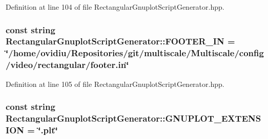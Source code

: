 \-Definition at line 104 of file \-Rectangular\-Gnuplot\-Script\-Generator.\-hpp.

\hypertarget{classmultiscale_1_1video_1_1RectangularGnuplotScriptGenerator_a5bff725c865bc3a426351644cee34229}{
\subsubsection[{\-F\-O\-O\-T\-E\-R\-\_\-\-I\-N}]{\setlength{\rightskip}{0pt plus 5cm}const string {\bf \-Rectangular\-Gnuplot\-Script\-Generator\-::\-F\-O\-O\-T\-E\-R\-\_\-\-I\-N} = \char`\"{}/home/ovidiu/\-Repositories/git/multiscale/\-Multiscale/config/video/rectangular/footer.\-in\char`\"{}}}\label{classmultiscale_1_1video_1_1RectangularGnuplotScriptGenerator_a5bff725c865bc3a426351644cee34229}


\-Definition at line 105 of file \-Rectangular\-Gnuplot\-Script\-Generator.\-hpp.

\hypertarget{classmultiscale_1_1video_1_1RectangularGnuplotScriptGenerator_afa1626f7904b3006ac768f770c799283}{
\subsubsection[{\-G\-N\-U\-P\-L\-O\-T\-\_\-\-E\-X\-T\-E\-N\-S\-I\-O\-N}]{\setlength{\rightskip}{0pt plus 5cm}const string {\bf \-Rectangular\-Gnuplot\-Script\-Generator\-::\-G\-N\-U\-P\-L\-O\-T\-\_\-\-E\-X\-T\-E\-N\-S\-I\-O\-N} = \char`\"{}.plt\char`\"{}}}\label{classmultiscale_1_1video_1_1RectangularGnuplotScriptGenerator_afa1626f7904b3006ac768f770c799283}


